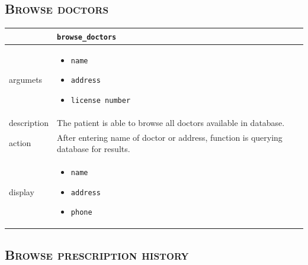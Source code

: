 \documentclass[12pt,titlepage]{article}
\begin{document}
\subsection{\textsc{Browse doctors}}

\begin{tabularx}{\textwidth}{ |p{2.5cm}|X| }
	\hline
	 &  \texttt{browse\_doctors}\\
\hline	
argumets & 
\begin{itemize}
\item \texttt{name}
\item \texttt{address}
\item \texttt{license number}
\end{itemize} \\
\hline
description & The patient is able to browse all doctors available in database.\\
\hline
action & After entering name of doctor or address, function is querying database for results.\\
\hline
display &
\begin{itemize}
\item \texttt{name}
\item \texttt{address}
\item \texttt{phone}
\end{itemize}\\
\hline
\end{tabularx}

\subsection{\textsc{Browse prescription history}}
\end{document}
